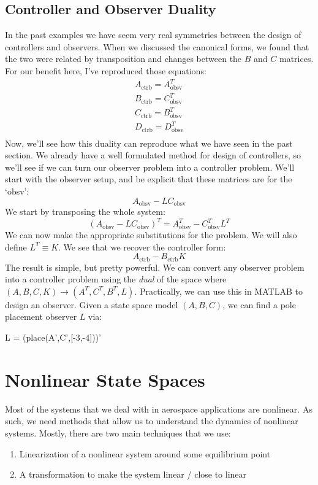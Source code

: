\subsection{Controller and Observer Duality}
In the past examples we have seem very real symmetries between the design of controllers and observers. When we discussed the canonical forms, we found that the two were related by transposition and changes between the $B$ and $C$ matrices. For our benefit here, I've reproduced those equations:
\begin{gather}
A_\text{ctrb}=A_\text{obsv}^T\\
B_\text{ctrb}=C_\text{obsv}^T\\
C_\text{ctrb}=B_\text{obsv}^T\\
D_\text{ctrb}=D_\text{obsv}^T\\
\end{gather}
Now, we'll see how this duality can reproduce what we have seen in the past section. We already have a well formulated method for design of controllers, so we'll see if we can turn our observer problem into a controller problem. We'll start with the observer setup, and be explicit that these matrices are for the `obsv':
$$A_\text{obsv}-LC_\text{obsv}$$
We start by transposing the whole system:
$$(A_\text{obsv}-LC_\text{obsv})^T=A_\text{obsv}^T-C_\text{obsv}^TL^T$$
We can now make the appropriate substitutions for the problem. We will also define $L^T\equiv K$. We see that we recover the controller form:
$$A_\text{ctrb}-B_\text{ctrb}K$$
The result is simple, but pretty powerful. We can convert any observer problem into a controller problem using the \textit{dual} of the space where $(A,B,C,K)\rightarrow(A^T,C^T,B^T,L)$. Practically, we can use this in MATLAB to design an observer. Given a state space model $(A,B,C)$, we can find a pole placement observer $L$ via:
\begin{matlabscript}{}
L = (place(A',C',[-3,-4]))'
\end{matlabscript}


\section{Nonlinear State Spaces}
Most of the systems that we deal with in aerospace applications are nonlinear. As such, we need methods that allow us to understand the dynamics of nonlinear systems. Mostly, there are two main techniques that we use:
\begin{enumerate}
    \item Linearization of a nonlinear system around some equilibrium point
    \item A transformation to make the system linear / close to linear
\end{enumerate}


